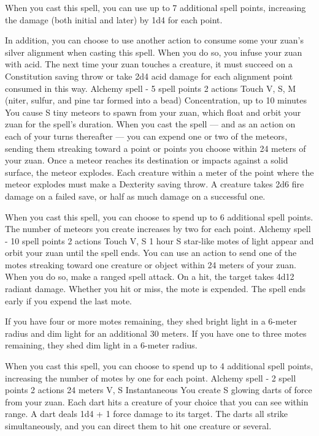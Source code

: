         When you cast this spell, you can use up to 7 additional spell points, increasing the damage (both initial and later) by 1d4 for each point.

        In addition, you can choose to use another action to consume some your zuan's silver alignment when casting this spell.
        When you do so, you infuse your zuan with acid.
        The next time your zuan touches a creature, it must succeed on a Constitution saving throw or take 2d4 acid damage for each alignment point consumed in this way.
        {Alchemy spell - 5 spell points}
        {2 actions}
        {Touch}
        {V, S, M (niter, sulfur, and pine tar formed into a bead)}
        {Concentration, up to 10 minutes}
        You cause S tiny meteors to spawn from your zuan, which float and orbit your zuan for the spell's duration.
        When you cast the spell --- and as an action on each of your turns thereafter --- you can expend one or two of the meteors, sending them streaking toward a point or points you choose within 24 meters of your zuan.
        Once a meteor reaches its destination or impacts against a solid surface, the meteor explodes.
        Each creature within a meter of the point where the meteor explodes must make a Dexterity saving throw.
        A creature takes 2d6 fire damage on a failed save, or half as much damage on a successful one.

        When you cast this spell, you can choose to spend up to 6 additional spell points.
        The number of meteors you create increases by two for each point.
        {Alchemy spell - 10 spell points}
        {2 actions}
        {Touch}
        {V, S}
        {1 hour}
        S star-like motes of light appear and orbit your zuan until the spell ends.
        You can use an action to send one of the motes streaking toward one creature or object within 24 meters of your zuan.
        When you do so, make a ranged spell attack.
        On a hit, the target takes 4d12 radiant damage.
        Whether you hit or miss, the mote is expended.
        The spell ends early if you expend the last mote.

        If you have four or more motes remaining, they shed bright light in a 6-meter radius and dim light for an additional 30 meters.
        If you have one to three motes remaining, they shed dim light in a 6-meter radius.

        When you cast this spell, you can choose to spend up to 4 additional spell points, increasing the number of motes by one for each point.
        {Alchemy spell - 2 spell points}
        {2 actions}
        {24 meters}
        {V, S}
        {Instantaneous}
        You create S glowing darts of force from your zuan.
        Each dart hits a creature of your choice that you can see within range.
        A dart deals 1d4 + 1 force damage to its target.
        The darts all strike simultaneously, and you can direct them to hit one creature or several.


